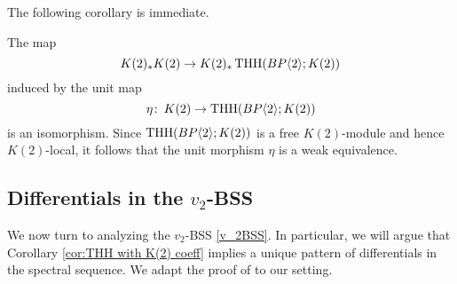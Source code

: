 \begin{comment}
Now, consider the Eilenberg-Moore spectral sequence 
\[
E^2_{s,t}\Tor^{K(2)_*\B}_{s,t}(K(2)_*K(2), K(2)_*\THH(\B))\implies K(2)_{s+t}(\THH(\B;K(2))).
\]
By the theorem, the $E^2$-term is isomorphic to 
\[
\Tor^{K(2)_*\B}(K(2)_*K(2), K(2)_*\B).
\]
Consequently the spectral sequence collapses to the $0$-line and $E_{*,*}^{\infty}\cong K(2)_*K(2)$. This proves the following corollary.
\end{comment}
The following corollary is immediate.
\begin{cor}\label{cor:THH with K(2) coeff}
	The map 
	\[ K(2)_*K(2) \to K(2)_*\operatorname{THH}(BP\langle 2 \rangle;K(2))\]
	induced by the unit map  
	\[\eta \colon \thinspace K(2)\to \operatorname{THH}(BP\langle 2 \rangle;K(2))\]
	is an isomorphism. 
	Since $\operatorname{THH}(BP\langle 2 \rangle;K(2))$ is a free $K(2)$-module and hence $K(2)$-local, it follows that the unit morphism $\eta$ is a weak equivalence.
\end{cor}

\subsection{Differentials in the $v_2$-BSS}
We now turn to analyzing the $v_2$-BSS \eqref{v_2BSS}. In particular, we will argue that Corollary \ref{cor:THH with K(2) coeff} implies a unique pattern of differentials in the spectral sequence. We adapt the proof of \cite{McClureStaffeldt} to our setting. 

